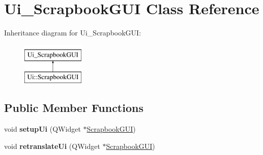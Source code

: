 \hypertarget{classUi__ScrapbookGUI}{}\section{Ui\+\_\+\+Scrapbook\+G\+UI Class Reference}
\label{classUi__ScrapbookGUI}
Inheritance diagram for Ui\+\_\+\+Scrapbook\+G\+UI\+:\begin{figure}[H]
\begin{center}
\leavevmode
\includegraphics[height=2.000000cm]{classUi__ScrapbookGUI}
\end{center}
\end{figure}
\subsection*{Public Member Functions}
\begin{DoxyCompactItemize}
\item 
void {\bfseries setup\+Ui} (Q\+Widget $\ast$\hyperlink{classScrapbookGUI}{Scrapbook\+G\+UI})\hypertarget{classUi__ScrapbookGUI_a7d4f7b9c43062d02225bd8254c144447}{}\label{classUi__ScrapbookGUI_a7d4f7b9c43062d02225bd8254c144447}

\item 
void {\bfseries retranslate\+Ui} (Q\+Widget $\ast$\hyperlink{classScrapbookGUI}{Scrapbook\+G\+UI})\hypertarget{classUi__ScrapbookGUI_a32a30d1f8e812a16ba4cb240ea761518}{}\label{classUi__ScrapbookGUI_a32a30d1f8e812a16ba4cb240ea761518}

\end{DoxyCompactItemize}

